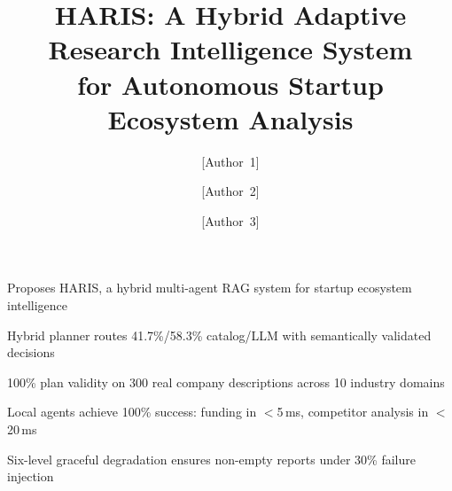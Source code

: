 \documentclass[preprint,12pt]{elsarticle}
\begin{document}
\begin{frontmatter}

\title{HARIS: A Hybrid Adaptive Research Intelligence System\\
       for Autonomous Startup Ecosystem Analysis}

\author[inst1]{[Author~1]}

\author[inst1]{[Author~2]}

\author[inst2]{[Author~3]}


\address[inst1]{[Department], [University 1], [City, Country]}
\address[inst2]{[Department], [University 2], [City, Country]}

\begin{highlights}
\item Proposes HARIS, a hybrid multi-agent RAG system for startup ecosystem intelligence
\item Hybrid planner routes 41.7\%/58.3\% catalog/LLM with semantically validated decisions
\item 100\% plan validity on 300 real company descriptions across 10 industry domains
\item Local agents achieve 100\% success: funding in $<$5\,ms, competitor analysis in $<$20\,ms
\item Six-level graceful degradation ensures non-empty reports under 30\% failure injection
\end{highlights}


\end{frontmatter}
\end{document}
